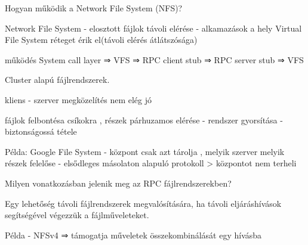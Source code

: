 \documentclass[twoside, a4paper, 12pt]{article}
\begin{document}
\begin{description}
                                                                    \item  Hogyan működik a Network File System (NFS)?
                                                                    \item Network File System
                                                                        - elosztott fájlok távoli elérése
                                                                        - alkamazások a hely Virtual File System réteget érik el(távoli elérés átlátszósága)
                                                                    \item működés
                                                                        System call layer ⇒ VFS ⇒ RPC client stub ⇒ RPC server stub ⇒ VFS 
                                                                    \item  Cluster alapú fájlrendszerek.  
                                                                    \item kliens - szerver megközelítés nem elég jó 
                                                                    \item fájlok felbontésa csíkokra , részek párhuzamos elérése
                                                                        - rendszer gyorsítása
                                                                        - biztonságossá tétele
                                                                    \item Példa: Google File System
                                                                        - központ csak azt tárolja , melyik szerver melyik részek felelőse
                                                                        - elsődleges másolaton alapuló protokoll
                                                                        > központot nem terheli
                                                                    \item  Milyen vonatkozásban jelenik meg az RPC fájlrendszerekben?
                                                                    \item Egy lehetőség távoli fájlrendszerek megvalósítására, ha távoli eljáráshívások segítségével végezzük a fájlműveleteket.
                                                                    \item Példa
                                                                        - NFSv4 ⇒ támogatja műveletek összekombinálását egy hívásba

\end{description}
\end{document}
